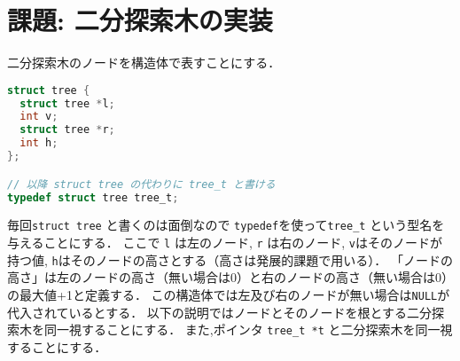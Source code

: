 \documentclass[a4paper,twoside,onecolumn,openany,article]{memoir}
\theoremstyle{remark}
\begin{document}
\section{課題: 二分探索木の実装}
二分探索木のノードを構造体で表すことにする．
\begin{lstlisting}[basicstyle=\ttfamily\small,showstringspaces=false,language=C,frame=single]
struct tree {
  struct tree *l;
  int v;
  struct tree *r;
  int h;
};

// 以降 struct tree の代わりに tree_t と書ける
typedef struct tree tree_t;
\end{lstlisting}
毎回\texttt{struct tree} と書くのは面倒なので \texttt{typedef}を使って\texttt{tree\_t} という型名を与えることにする．
ここで \texttt{l} は左のノード, \texttt{r} は右のノード, \texttt{v}はそのノードが持つ値, \texttt{h}はそのノードの高さとする（高さは発展的課題で用いる）．
「ノードの高さ」は左のノードの高さ（無い場合は0）と右のノードの高さ（無い場合は0）の最大値+1と定義する．
この構造体では左及び右のノードが無い場合は\texttt{NULL}が代入されているとする．
以下の説明ではノードとそのノードを根とする二分探索木を同一視することにする．
また,ポインタ \texttt{tree\_t *t} と二分探索木を同一視することにする．
\end{document}

